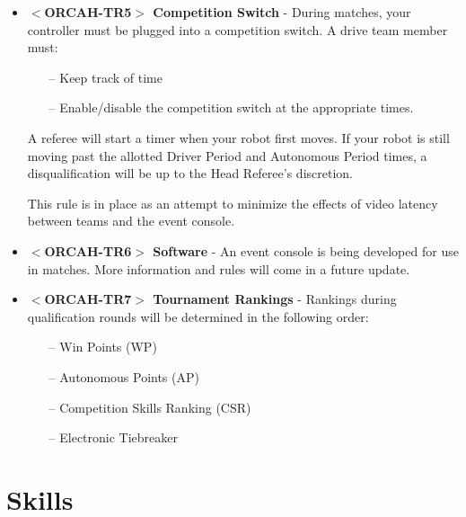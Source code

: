 \documentclass[letterpaper, 12pt]{article}
\begin{document}
\begin{itemize}[label={}]
\item\textbf{$<$ORCAH-TR5$>$ Competition Switch} - During matches, your controller must be plugged into a competition switch.  A drive team member must:
\begin{itemize}
\item[--] Keep track of time
\item[--] Enable/disable the competition switch at the appropriate times.
\end{itemize}

A referee will start a timer when your robot first moves.  If your robot is still moving past the allotted Driver Period and Autonomous Period times, a disqualification will be up to the Head Referee’s discretion. 

This rule is in place as an attempt to minimize the effects of video latency between teams and the event console.

\item\textbf{$<$ORCAH-TR6$>$ Software} - An event console is being developed for use in matches. More information and rules will come in a future update.

\item\textbf{$<$ORCAH-TR7$>$ Tournament Rankings} - Rankings during qualification rounds will be determined in the following order:

\begin{itemize}
\item[--] Win Points (WP)
\item[--] Autonomous Points (AP)
\item[--] Competition Skills Ranking (CSR)
\item[--] Electronic Tiebreaker
\end{itemize}

\end{itemize}

\section{Skills}
\end{document}
